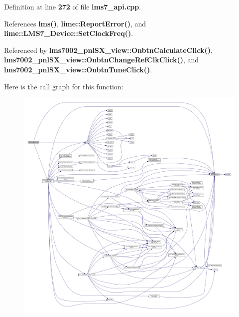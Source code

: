 Definition at line {\bf 272} of file {\bf lms7\+\_\+api.\+cpp}.



References {\bf lms()}, {\bf lime\+::\+Report\+Error()}, and {\bf lime\+::\+L\+M\+S7\+\_\+\+Device\+::\+Set\+Clock\+Freq()}.



Referenced by {\bf lms7002\+\_\+pnl\+S\+X\+\_\+view\+::\+Onbtn\+Calculate\+Click()}, {\bf lms7002\+\_\+pnl\+S\+X\+\_\+view\+::\+Onbtn\+Change\+Ref\+Clk\+Click()}, and {\bf lms7002\+\_\+pnl\+S\+X\+\_\+view\+::\+Onbtn\+Tune\+Click()}.



Here is the call graph for this function\+:
\nopagebreak
\begin{figure}[H]
\begin{center}
\leavevmode
\includegraphics[width=350pt]{df/de1/lms7__api_8cpp_af73c9ae3c39c8e5843b2ee6fb4774ec2_cgraph}
\end{center}
\end{figure}




